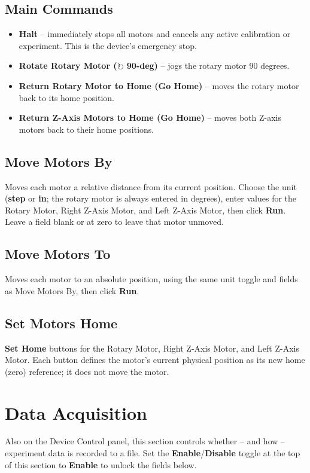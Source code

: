 \documentclass[12pt]{report}
\begin{document}
\subsection{Main Commands}
\begin{itemize}
    \item \textbf{Halt} -- immediately stops all motors and cancels any active calibration or experiment. This is the device's emergency stop.
    \item \textbf{Rotate Rotary Motor ($\circlearrowright$ 90-deg)} -- jogs the rotary motor 90 degrees.
    \item \textbf{Return Rotary Motor to Home (Go Home)} -- moves the rotary motor back to its home position.
    \item \textbf{Return Z-Axis Motors to Home (Go Home)} -- moves both Z-axis motors back to their home positions.
\end{itemize}

\subsection{Move Motors By}
Moves each motor a relative distance from its current position. Choose the unit (\textbf{step} or \textbf{in}; the rotary motor is always entered in degrees), enter values for the Rotary Motor, Right Z-Axis Motor, and Left Z-Axis Motor, then click \textbf{Run}. Leave a field blank or at zero to leave that motor unmoved.

\subsection{Move Motors To}
Moves each motor to an absolute position, using the same unit toggle and fields as Move Motors By, then click \textbf{Run}.

\subsection{Set Motors Home}
\textbf{Set Home} buttons for the Rotary Motor, Right Z-Axis Motor, and Left Z-Axis Motor. Each button defines the motor's current physical position as its new home (zero) reference; it does not move the motor.

\newpage
\section{Data Acquisition}
Also on the Device Control panel, this section controls whether -- and how -- experiment data is recorded to a file. Set the \textbf{Enable}/\textbf{Disable} toggle at the top of this section to \textbf{Enable} to unlock the fields below.
\end{document}
